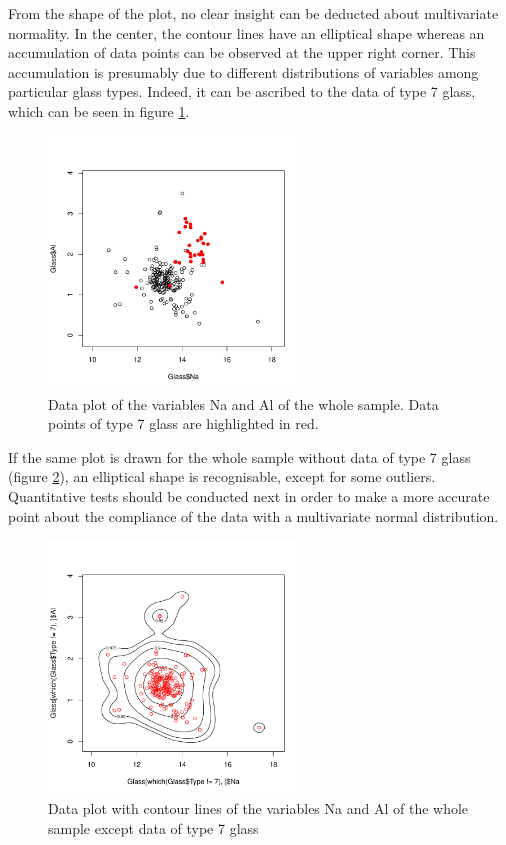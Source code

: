 \documentclass[a4paper, 12pt, titlepage, headsepline, listof = totoc, bibliography = totoc, numbers = noenddot]{scrartcl}
\begin{document}
From the shape of the plot, no clear insight can be deducted about multivariate normality. In the center, the contour lines have an elliptical shape whereas an accumulation of data points can be observed at the upper right corner. This accumulation is presumably due to different distributions of variables among particular glass types. Indeed, it can be ascribed to the data of type 7 glass, which can be seen in figure \ref{fig:cluster7}.

\begin{figure}[h!]
\centering
\includegraphics[width=0.6\textwidth]{report-cluster7}
\caption{Data plot of the variables Na and Al of the whole sample. Data points of type 7 glass are highlighted in red.}
\label{fig:cluster7}
\end{figure}

If the same plot is drawn for the whole sample without data of type 7 glass (figure \ref{fig:contourGlassNaAl-7}), an elliptical shape is recognisable, except for some outliers. Quantitative tests should be conducted next in order to make a more accurate point about the compliance of the data with a multivariate normal distribution.

\begin{figure}[h!]
\centering
\includegraphics[width=0.6\textwidth]{report-contourGlassNaAl-7}
\caption{Data plot with contour lines of the variables Na and Al of the whole sample except data of type 7 glass}
\label{fig:contourGlassNaAl-7}
\end{figure}
\end{document}
